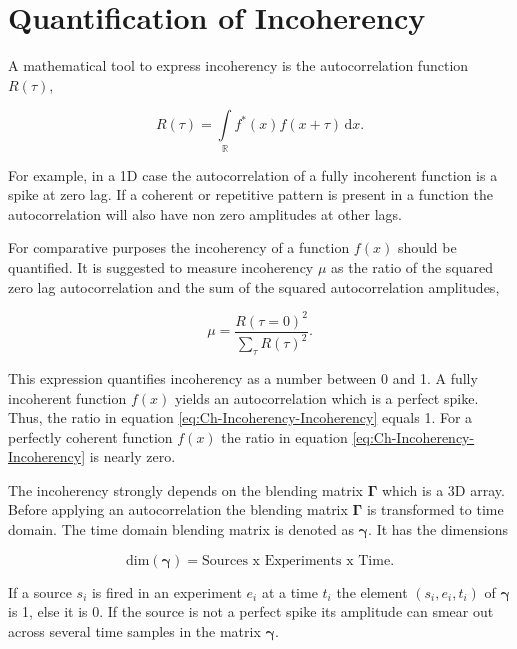 \section{Quantification of Incoherency}

A mathematical tool to express incoherency is the autocorrelation function $R(\tau)$,

\begin{equation}
	R(\tau) = \int\limits_{\mathbb{R}} f^*(x) f(x + \tau) \, \text{d} x.
	\label{eq:Ch-Incoherency-Autocorrelation}
\end{equation}

For example, in a 1D case the autocorrelation of a fully incoherent function is a spike at zero lag. If a coherent or repetitive pattern is present in a function the autocorrelation will also have non zero amplitudes at other lags. 

For comparative purposes the incoherency of a function $f(x)$ should be quantified. It is suggested to measure incoherency $\mu$ as the ratio of the squared zero lag autocorrelation and the sum of the squared autocorrelation amplitudes,

\begin{equation}
	\mu = \frac{R(\tau = 0)^2}{\sum\limits_{\tau} R(\tau)^2}	.
	\label{eq:Ch-Incoherency-Incoherency}
\end{equation} 

This expression quantifies incoherency as a number between 0 and 1. A fully incoherent function $f(x)$ yields an autocorrelation which is a perfect spike. Thus, the ratio in equation \ref{eq:Ch-Incoherency-Incoherency} equals 1. For a perfectly coherent function $f(x)$ the ratio in equation \ref{eq:Ch-Incoherency-Incoherency} is nearly zero.

The incoherency strongly depends on the blending matrix $\mathbf{\Gamma}$ which is a 3D array. Before applying an autocorrelation the blending matrix $\mathbf{\Gamma}$ is transformed to time domain. The time domain blending matrix is denoted as $\mathbf{\gamma}$. It has the dimensions

\begin{equation}
	\text{dim}(\mathbf{\gamma}) = \text{Sources x Experiments x Time}.
	\label{eq:Ch-Incoherency-gamma}
\end{equation}

If a source $s_i$ is fired in an experiment $e_i$ at a time $t_i$ the element $(s_i,e_i,t_i)$ of $\mathbf{\gamma}$ is 1, else it is 0. If the source is not a perfect spike its amplitude can smear out across several time samples in the matrix $\mathbf{\gamma}$.

